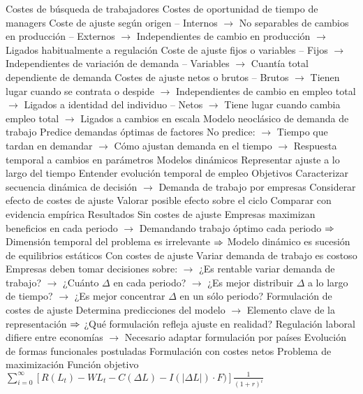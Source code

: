 \documentclass{nuevotema}
\begin{document}
\begin{esquemal}
				\4[] Costes de búsqueda de trabajadores
				\4[] Costes de oportunidad de tiempo de managers
				\4 Coste de ajuste según origen
				\4[] -- Internos
				\4[] $\to$ No separables de cambios en producción
				\4[] -- Externos
				\4[] $\to$ Independientes de cambio en producción
				\4[] $\to$ Ligados habitualmente a regulación
				\4 Coste de ajuste fijos o variables
				\4[] -- Fijos
				\4[] $\to$ Independientes de variación de demanda
				\4[] -- Variables
				\4[] $\to$ Cuantía total dependiente de demanda
				\4 Costes de ajuste netos o brutos
				\4[] -- Brutos
				\4[] $\to$ Tienen lugar cuando se contrata o despide
				\4[] $\to$ Independientes de cambio en empleo total
				\4[] $\to$ Ligados a identidad del individuo
				\4[] -- Netos
				\4[] $\to$ Tiene lugar cuando cambia empleo total
				\4[] $\to$ Ligados a cambios en escala
				\4 Modelo neoclásico de demanda de trabajo
				\4[] Predice demandas óptimas de factores
				\4[] No predice:
				\4[] $\to$ Tiempo que tardan en demandar
				\4[] $\to$ Cómo ajustan demanda en el tiempo
				\4[] $\to$ Respuesta temporal a cambios en parámetros
				\4 Modelos dinámicos
				\4[] Representar ajuste a lo largo del tiempo
				\4[] Entender evolución temporal de empleo
			\3 Objetivos
				\4 Caracterizar secuencia dinámica de decisión
				\4[] $\to$ Demanda de trabajo por empresas
				\4 Considerar efecto de costes de ajuste
				\4 Valorar posible efecto sobre el ciclo
				\4 Comparar con evidencia empírica
			\3 Resultados
				\4 Sin costes de ajuste
				\4[] Empresas maximizan beneficios en cada periodo
				\4[] $\to$ Demandando trabajo óptimo cada periodo
				\4[] $\Rightarrow$ Dimensión temporal del problema es irrelevante
				\4[] $\Rightarrow$ Modelo dinámico es sucesión de equilibrios estáticos
				\4 Con costes de ajuste
				\4[] Variar demanda de trabajo es costoso
				\4[] Empresas deben tomar decisiones sobre:
				\4[] $\to$ ¿Es rentable variar demanda de trabajo?
				\4[] $\to$ ¿Cuánto $\Delta$ en cada periodo?
				\4[] $\to$ ¿Es mejor distribuir $\Delta$ a lo largo de tiempo?
				\4[] $\to$ ¿Es mejor concentrar $\Delta$ en un sólo periodo?
				\4 Formulación de costes de ajuste
				\4[] Determina predicciones del modelo
				\4[] $\to$ Elemento clave de la representación
				\4[] $\Rightarrow$ ¿Qué formulación refleja ajuste en realidad?
				\4[] Regulación laboral difiere entre economías
				\4[] $\to$ Necesario adaptar formulación por países
				\4 Evolución de formas funcionales postuladas
		\2 Formulación con costes netos
			\3 Problema de maximización
				\4 Función objetivo
				\4[] $\sum_{i=0}^\infty \left[ R(L_t) - WL_t - C(\Delta{L}) - I(| \Delta{L} |)\cdot F ) \right] \frac{1}{(1+r)^i}$

\end{esquemal}
\end{document}
